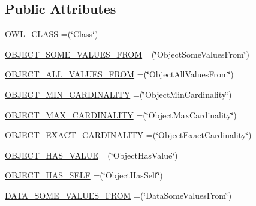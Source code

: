 \subsection*{Public Attributes}
\begin{DoxyCompactItemize}
\item 
\hyperlink{enumorg_1_1semanticweb_1_1owlapi_1_1model_1_1_class_expression_type_ad4dbbf88aeb69c00e73559d6deb13c6b}{O\-W\-L\-\_\-\-C\-L\-A\-S\-S} =(\char`\"{}Class\char`\"{})
\item 
\hyperlink{enumorg_1_1semanticweb_1_1owlapi_1_1model_1_1_class_expression_type_ad239323e022818f8ae22c242d9afe914}{O\-B\-J\-E\-C\-T\-\_\-\-S\-O\-M\-E\-\_\-\-V\-A\-L\-U\-E\-S\-\_\-\-F\-R\-O\-M} =(\char`\"{}Object\-Some\-Values\-From\char`\"{})
\item 
\hyperlink{enumorg_1_1semanticweb_1_1owlapi_1_1model_1_1_class_expression_type_a5c613c62e6bfdff308dd81ee82910eea}{O\-B\-J\-E\-C\-T\-\_\-\-A\-L\-L\-\_\-\-V\-A\-L\-U\-E\-S\-\_\-\-F\-R\-O\-M} =(\char`\"{}Object\-All\-Values\-From\char`\"{})
\item 
\hyperlink{enumorg_1_1semanticweb_1_1owlapi_1_1model_1_1_class_expression_type_a6a284d13da94ff9b0f1736ddc2e9e7bd}{O\-B\-J\-E\-C\-T\-\_\-\-M\-I\-N\-\_\-\-C\-A\-R\-D\-I\-N\-A\-L\-I\-T\-Y} =(\char`\"{}Object\-Min\-Cardinality\char`\"{})
\item 
\hyperlink{enumorg_1_1semanticweb_1_1owlapi_1_1model_1_1_class_expression_type_aaf0598506959d47fb1a16cea2d66434d}{O\-B\-J\-E\-C\-T\-\_\-\-M\-A\-X\-\_\-\-C\-A\-R\-D\-I\-N\-A\-L\-I\-T\-Y} =(\char`\"{}Object\-Max\-Cardinality\char`\"{})
\item 
\hyperlink{enumorg_1_1semanticweb_1_1owlapi_1_1model_1_1_class_expression_type_a36537723bfbbe4308b3e9041edb60cf5}{O\-B\-J\-E\-C\-T\-\_\-\-E\-X\-A\-C\-T\-\_\-\-C\-A\-R\-D\-I\-N\-A\-L\-I\-T\-Y} =(\char`\"{}Object\-Exact\-Cardinality\char`\"{})
\item 
\hyperlink{enumorg_1_1semanticweb_1_1owlapi_1_1model_1_1_class_expression_type_ae552eee4ce42bd9002f8454076613abc}{O\-B\-J\-E\-C\-T\-\_\-\-H\-A\-S\-\_\-\-V\-A\-L\-U\-E} =(\char`\"{}Object\-Has\-Value\char`\"{})
\item 
\hyperlink{enumorg_1_1semanticweb_1_1owlapi_1_1model_1_1_class_expression_type_a9e3827991888286564ee272a32d90b75}{O\-B\-J\-E\-C\-T\-\_\-\-H\-A\-S\-\_\-\-S\-E\-L\-F} =(\char`\"{}Object\-Has\-Self\char`\"{})
\item 
\hyperlink{enumorg_1_1semanticweb_1_1owlapi_1_1model_1_1_class_expression_type_a1a4843a6c20609e2c2f7dabfb4ac2bb8}{D\-A\-T\-A\-\_\-\-S\-O\-M\-E\-\_\-\-V\-A\-L\-U\-E\-S\-\_\-\-F\-R\-O\-M} =(\char`\"{}Data\-Some\-Values\-From\char`\"{})

\end{DoxyCompactItemize}
